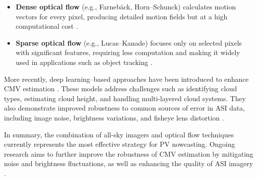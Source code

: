 \begin{itemize}

\item \textbf{Dense optical flow} (e.g., Farnebäck, Horn--Schunck) calculates motion vectors for every pixel, producing detailed motion fields but at a high computational cost \cite{farneback2003two,horn1981determining}.

\item \textbf{Sparse optical flow} (e.g., Lucas--Kanade) focuses only on selected pixels with significant features, requiring less computation and making it widely used in applications such as object tracking \cite{lucas1981iterative}.

\end{itemize}

More recently, deep learning--based approaches have been introduced to enhance CMV estimation \cite{doshi2022}. These models address challenges such as identifying cloud types, estimating cloud height, and handling multi-layered cloud systems. They also demonstrate improved robustness to common sources of error in ASI data, including image noise, brightness variations, and fisheye lens distortion \cite{shi2015,nie2024}.

In summary, the combination of all-sky imagers and optical flow techniques currently represents the most effective strategy for PV nowcasting. Ongoing research aims to further improve the robustness of CMV estimation by mitigating noise and brightness fluctuations, as well as enhancing the quality of ASI imagery \cite{jung2020}.